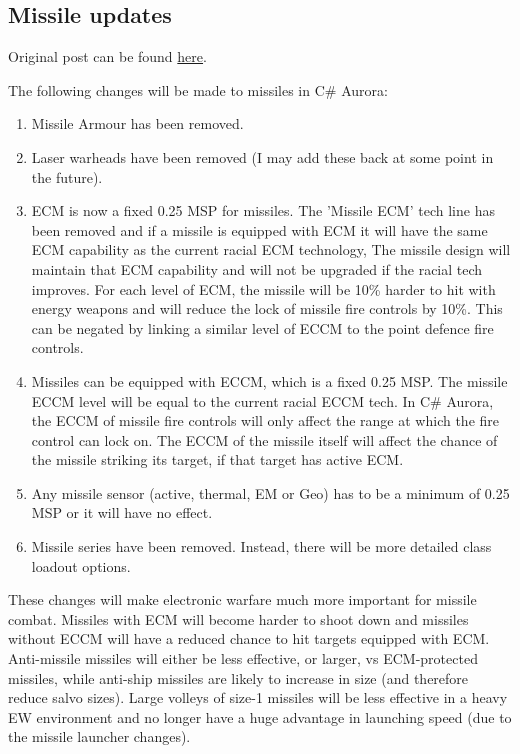 \documentclass[../Aurora C# unofficial manual.tex]{subfiles}
\begin{document}
	\subsection{Missile updates}
	Original post can be found
	\href{http://aurora2.pentarch.org/index.php?topic=8495.msg103096#msg103096}{here}.
	\newline\newline
	
	The following changes will be made to missiles in C\# Aurora:
	\begin{enumerate}
		\item Missile Armour has been removed.
		\item Laser warheads have been removed (I may add these back at some point in the future).
		\item ECM is now a fixed 0.25 MSP for missiles. The 'Missile ECM' tech line has been removed and if a missile is equipped with ECM it will have the same ECM capability as the current racial ECM technology, The missile design will maintain that ECM capability and will not be upgraded if the racial tech improves. For each level of ECM, the missile will be 10\% harder to hit with energy weapons and will reduce the lock of missile fire controls by 10\%. This can be negated by linking a similar level of ECCM to the point defence fire controls.
		\item Missiles can be equipped with ECCM, which is a fixed 0.25 MSP. The missile ECCM level will be equal to the current racial ECCM tech. In C\# Aurora, the ECCM of missile fire controls will only affect the range at which the fire control can lock on. The ECCM of the missile itself will affect the chance of the missile striking its target, if that target has active ECM.
		\item Any missile sensor (active, thermal, EM or Geo) has to be a minimum of 0.25 MSP or it will have no effect.
		\item Missile series have been removed. Instead, there will be more detailed class loadout options.
	\end{enumerate}

	These changes will make electronic warfare much more important for missile combat. Missiles with ECM will become harder to shoot down and missiles without ECCM will have a reduced chance to hit targets equipped with ECM. Anti-missile missiles will either be less effective, or larger, vs ECM-protected missiles, while anti-ship missiles are likely to increase in size (and therefore reduce salvo sizes). Large volleys of size-1 missiles will be less effective in a heavy EW environment and no longer have a huge advantage in launching speed (due to the missile launcher changes).
	
\end{document}
